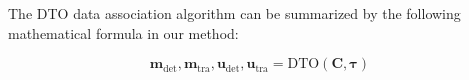 
 

The DTO data association algorithm can be summarized by the following mathematical formula in our method:

\begin{equation}
    \mathbf{m}_{\mathrm{det}}, \mathbf{m}_{\mathrm{tra}}, \mathbf{u}_{\mathrm{det}}, \mathbf{u}_{\mathrm{tra}} = \mathrm{DTO}(\mathbf{C}, \boldsymbol{\tau})
    \label{eq:DTO}
\end{equation}


